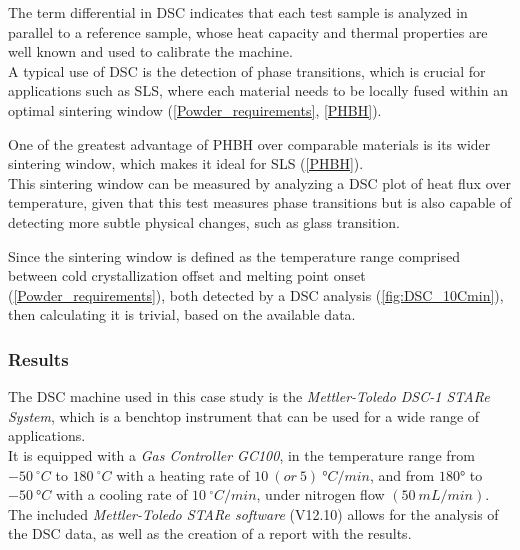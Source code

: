 \documentclass{article}
\begin{document}
        
        The term differential in DSC indicates that each test sample is analyzed in parallel to a reference sample, whose heat capacity and 
        thermal properties are well known and used to calibrate the machine. \\
        
        A typical use of DSC is the detection of phase transitions, which is crucial for applications such as SLS, where each material 
        needs to be locally fused within an optimal sintering window (\ref{Powder_requirements}, \ref{PHBH}). 

        One of the greatest advantage of PHBH over comparable materials is its wider sintering window, which makes it ideal 
        for SLS (\ref{PHBH}). \\ 

        This sintering window can be measured by analyzing a DSC plot of heat flux over temperature, given that this test measures 
        phase transitions but is also capable of detecting more subtle physical changes, such as glass transition. 

        Since the sintering window is defined as the temperature range comprised between cold crystallization offset and 
        melting point onset (\ref{Powder_requirements}), both detected by a DSC analysis (\ref{fig:DSC_10Cmin}), then calculating it is trivial, 
        based on the available data. 

            \subsubsection{Results}

                The DSC machine used in this case study is the \textit{Mettler-Toledo DSC-1 STARe System}, which is a benchtop instrument that can be used for 
                a wide range of applications. \\ 

                It is equipped with a \textit{Gas Controller GC100}, in the temperature range from $-50 \ ^{\circ} C$ 
                to $180 \ ^{\circ} C$ with 
                a heating rate of $10 \ (or \ 5) \ °C/min$, and from $180°$ to $-50 \ °C$ with a cooling rate of $10  \ ^{\circ}C/min$, 
                under nitrogen flow $(50 \ mL/min)$. \\ 

                The included \textit{Mettler-Toledo STARe software} (V12.10) allows for the analysis of the 
                DSC data, as well as the creation of a report with the results. \\ 
\end{document}
